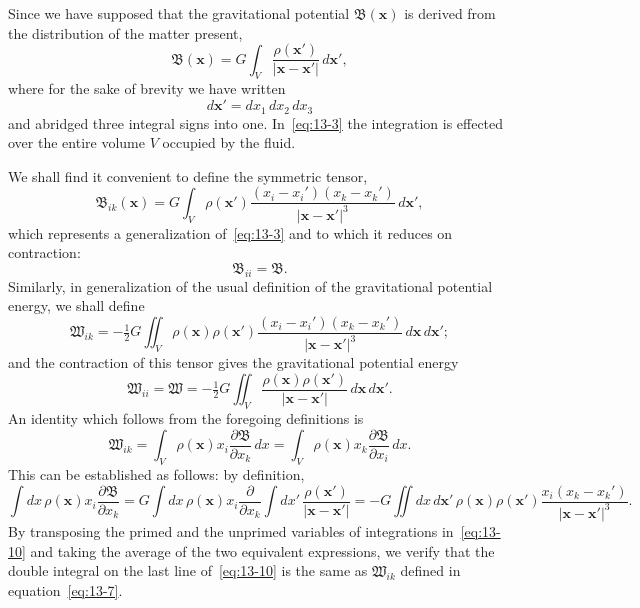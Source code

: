 Since we have supposed that the gravitational potential $\mathfrak{B}(\mathbf{x})$ is derived from the distribution of the matter present,
\begin{equation}
\label{eq:13-3}
\mathfrak{B}(\mathbf{x}) = G \int_V \frac{\rho(\mathbf{x}')}{|\mathbf{x}-\mathbf{x}'|}\,d\mathbf{x}',
\end{equation}
where for the sake of brevity we have written
\begin{equation}
\label{eq:13-4}
d\mathbf{x}' = dx_1\,dx_2\,dx_3
\end{equation}
and abridged three integral signs into one. In~\eqref{eq:13-3} the integration is effected over the entire volume $V$ occupied by the fluid.

We shall find it convenient to define the symmetric tensor,
\begin{equation}
\label{eq:13-5}
\mathfrak{B}_{ik}(\mathbf{x}) = G \int_V \rho(\mathbf{x}') \frac{(x_i-x_i')(x_k-x_k')}{|\mathbf{x}-\mathbf{x}'|^3}\,d\mathbf{x}',
\end{equation}
which represents a generalization of~\eqref{eq:13-3} and to which it reduces on contraction:
\begin{equation}
\label{eq:13-6}
\mathfrak{B}_{ii} = \mathfrak{B}.
\end{equation}
Similarly, in generalization of the usual definition of the gravitational potential energy, we shall define
\begin{equation}
\label{eq:13-7}
\mathfrak{W}_{ik} = -\tfrac{1}{2}G \iint_V \rho(\mathbf{x})\rho(\mathbf{x}') \frac{(x_i-x_i')(x_k-x_k')}{|\mathbf{x}-\mathbf{x}'|^3}\,d\mathbf{x}\,d\mathbf{x}';
\end{equation}
and the contraction of this tensor gives the gravitational potential energy
\begin{equation}
\label{eq:13-8}
\mathfrak{W}_{ii} = \mathfrak{W} = -\tfrac{1}{2}G \iint_V \frac{\rho(\mathbf{x})\rho(\mathbf{x}')}{|\mathbf{x}-\mathbf{x}'|}\,d\mathbf{x}\,d\mathbf{x}'.
\end{equation}
An identity which follows from the foregoing definitions is
\begin{equation}
\label{eq:13-9}
\mathfrak{W}_{ik} = \int_V \rho(\mathbf{x}) x_i \frac{\partial\mathfrak{B}}{\partial x_k}\,dx = \int_V \rho(\mathbf{x}) x_k \frac{\partial\mathfrak{B}}{\partial x_i}\,dx.
\end{equation}
This can be established as follows: by definition,
\begin{equation}
\label{eq:13-10}
\int dx\,\rho(\mathbf{x}) x_i \frac{\partial\mathfrak{B}}{\partial x_k} = G \int dx\,\rho(\mathbf{x}) x_i \frac{\partial}{\partial x_k} \int dx'\,\frac{\rho(\mathbf{x}')}{|\mathbf{x}-\mathbf{x}'|}
= -G \iint dx\,d\mathbf{x}'\,\rho(\mathbf{x})\rho(\mathbf{x}') \frac{x_i(x_k-x_k')}{|\mathbf{x}-\mathbf{x}'|^3}.
\end{equation}
By transposing the primed and the unprimed variables of integrations in~\eqref{eq:13-10} and taking the average of the two equivalent expressions, we verify that the double integral on the last line of~\eqref{eq:13-10} is the same as $\mathfrak{W}_{ik}$ defined in equation~\eqref{eq:13-7}.

